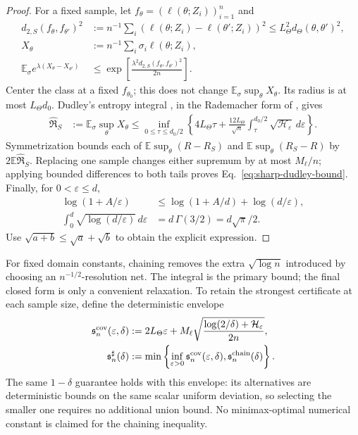 \begin{proof}
For a fixed sample, let $f_\theta=(\ell(\theta;Z_i))_{i=1}^n$ and
\begin{align}
 d_{2,S}(f_\theta,f_{\theta'})^2
 &:=n^{-1}\sum_i(\ell(\theta;Z_i)-\ell(\theta';Z_i))^2
 \le L_\Theta^2d_\Theta(\theta,\theta')^2,\\
 X_\theta&:=n^{-1}\sum_i\sigma_i\ell(\theta;Z_i),\\
 \mathbb E_\sigma e^{\lambda(X_\theta-X_{\theta'})}
 &\le\exp\left[\frac{\lambda^2d_{2,S}(f_\theta,f_{\theta'})^2}{2n}\right].
\end{align}
Center the class at a fixed $f_{\theta_0}$; this does not change $\mathbb E_\sigma\sup_\theta X_\theta$. Its radius is at most $L_\Theta d_0$. Dudley's entropy integral \citep{dudley1967sizes}, in the Rademacher form of \citet[Theorem~15.2]{telgarsky2021notes}, gives
\begin{align}
 \widehat{\mathfrak R}_S
 &:=\mathbb E_\sigma\sup_\theta X_\theta
 \le\inf_{0\le\tau\le d_0/2}\left\{4L_\Theta\tau+
 \frac{12L_\Theta}{\sqrt n}\int_\tau^{d_0/2}\sqrt{\mathcal H_\varepsilon}\,d\varepsilon\right\}.
\end{align}
Symmetrization \citep{bartlett2002rademacher} bounds each of
$\mathbb E\sup_\theta(R-R_S)$ and $\mathbb E\sup_\theta(R_S-R)$ by $2\mathbb E\widehat{\mathfrak R}_S$. Replacing one sample changes either supremum by at most $M_\ell/n$; applying bounded differences to both tails proves Eq.~\eqref{eq:sharp-dudley-bound}.
Finally, for $0<\varepsilon\le d$,
\begin{align}
 \log(1+A/\varepsilon)&\le\log(1+A/d)+\log(d/\varepsilon),\\
 \int_0^d\sqrt{\log(d/\varepsilon)}\,d\varepsilon
 &=d\,\Gamma(3/2)=d\sqrt\pi/2.
\end{align}
Use $\sqrt{a+b}\le\sqrt a+\sqrt b$ to obtain the explicit expression.
\end{proof}

For fixed domain constants, chaining removes the extra $\sqrt{\log n}$ introduced by choosing an $n^{-1/2}$-resolution net. The integral is the primary bound; the final closed form is only a convenient relaxation. To retain the strongest certificate at each sample size, define the deterministic envelope
\begin{align}
 \mathfrak s_n^{\rm cov}(\varepsilon,\delta)
 &:=2L_\Theta\varepsilon+
 M_\ell\sqrt{\frac{\log(2/\delta)+\mathcal H_\varepsilon}{2n}},\\
 \mathfrak s_n^\sharp(\delta)
 &:=\min\left\{\inf_{\varepsilon>0}\mathfrak s_n^{\rm cov}(\varepsilon,\delta),
 \mathfrak s_n^{\rm chain}(\delta)\right\}.\label{eq:sharp-statistical-envelope}
\end{align}
The same $1-\delta$ guarantee holds with this envelope: its alternatives are deterministic bounds on the same scalar uniform deviation, so selecting the smaller one requires no additional union bound. No minimax-optimal numerical constant is claimed for the chaining inequality.

